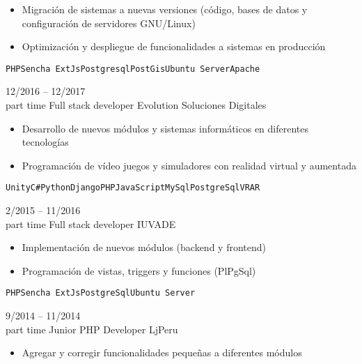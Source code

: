 \begin{entrylist}
{\begin{itemize}
    	        \setlength\itemsep{0pt}
    	        \item Migración de sistemas a nuevas versiones (código, bases de datos y configuración de servidores GNU/Linux)
    	        \item Optimización y despliegue de funcionalidades a sistemas en producción
    	    \end{itemize}
		    \texttt{PHP}\slashsep\texttt{Sencha ExtJs}\slashsep\texttt{Postgresql}\slashsep\texttt{PostGis}\slashsep\texttt{Ubuntu Server}\slashsep\texttt{Apache}
        }
	\entry
		{12/2016 -- 12/2017\\\footnotesize{part time}}
		{Full stack developer}
		{Evolution Soluciones Digitales}
		{
		    \vspace{-5mm}
    	    \begin{itemize}
    	        \setlength\itemsep{0pt}
    	        \item Desarrollo de nuevos módulos y sistemas informáticos en diferentes tecnologías
    	        \item Programación de vídeo juegos y simuladores con realidad virtual y aumentada
    	    \end{itemize}\texttt{Unity}\slashsep\texttt{C\#}\slashsep\texttt{Python}\slashsep\texttt{Django}\slashsep\texttt{PHP}\slashsep\texttt{JavaScript}\slashsep\texttt{MySql}\slashsep\texttt{PostgreSql}\slashsep\texttt{VR}\slashsep\texttt{AR}
        }
	\entry
		{2/2015 -- 11/2016\\\footnotesize{part time}}
		{Full stack developer}
		{IUVADE}
		{
		    \vspace{-5mm}
    	    \begin{itemize}
    	        \setlength\itemsep{0pt}
    	        \item Implementación de nuevos módulos (backend y frontend)
    	        \item Programación de vistas, triggers y funciones (PlPgSql)
    	    \end{itemize}
		    \texttt{PHP}\slashsep\texttt{Sencha ExtJs}\slashsep\texttt{PostgreSql}\slashsep\texttt{Ubuntu Server}
        }
	\entry
		{9/2014 -- 11/2014\\\footnotesize{part time}}
		{Junior PHP Developer}
		{LjPeru}
		{
		    \vspace{-5mm}
    	    \begin{itemize}
    	        \setlength\itemsep{0pt}
    	        \item Agregar y corregir funcionalidades pequeñas a diferentes módulos
    	    \end{itemize}
}
\end{entrylist}
